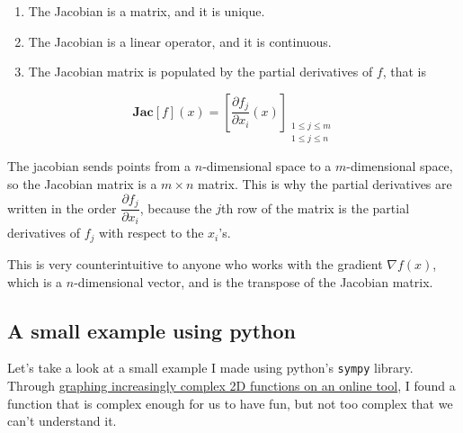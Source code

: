 \documentclass[
  letterpaper,
  DIV=11,
  numbers=noendperiod]{scrreprt}
\providecommand{\tightlist}{%
  \setlength{\itemsep}{0pt}\setlength{\parskip}{0pt}}\usepackage{longtable,booktabs,array}
\begin{document}
\begin{enumerate}
\def\labelenumi{\arabic{enumi}.}
\tightlist
\item
  The Jacobian is a matrix, and it is unique.
\item
  The Jacobian is a linear operator, and it is continuous.
\item
  The Jacobian matrix is populated by the partial derivatives of \(f\),
  that is
\end{enumerate}

\[ \textbf{Jac}[f](x) = \left[\dfrac{\partial f_j}{\partial x_i}(x)\right]_{\substack{1\leq j \leq m\\1\leq j \leq n}}\]

\begin{tcolorbox}[enhanced jigsaw, opacitybacktitle=0.6, leftrule=.75mm, left=2mm, titlerule=0mm, rightrule=.15mm, breakable, toptitle=1mm, colbacktitle=quarto-callout-caution-color!10!white, toprule=.15mm, colframe=quarto-callout-caution-color-frame, bottomrule=.15mm, colback=white, bottomtitle=1mm, title=\textcolor{quarto-callout-caution-color}{\faFire}\hspace{0.5em}{Careful about the dimensions !}, opacityback=0, arc=.35mm, coltitle=black]

The jacobian sends points from a \(n\)-dimensional space to a
\(m\)-dimensional space, so the Jacobian matrix is a \(m\times n\)
matrix. This is why the partial derivatives are written in the order
\(\dfrac{\partial f_j}{\partial x_i}\), because the \(j\)th row of the
matrix is the partial derivatives of \(f_j\) with respect to the
\(x_i\)'s.

This is very counterintuitive to anyone who works with the gradient
\(\nabla f(x)\), which is a \(n\)-dimensional vector, and is the
transpose of the Jacobian matrix.

\end{tcolorbox}

\hypertarget{a-small-example-using-python}{%
\subsection{A small example using
python}\label{a-small-example-using-python}}

Let's take a look at a small example I made using python's
\texttt{sympy} library. Through \href{https://www.math3d.org/}{graphing
increasingly complex 2D functions on an online tool}, I found a function
that is complex enough for us to have fun, but not too complex that we
can't understand it.
\end{document}
